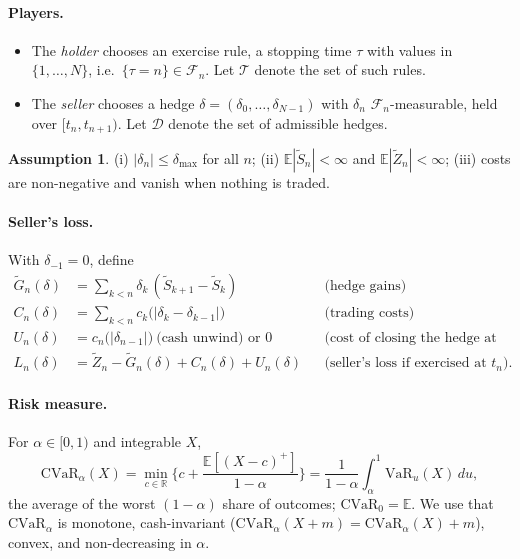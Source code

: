 \documentclass[11pt]{article}
\theoremstyle{definition}
\newtheorem{assumption}{Assumption}
\theoremstyle{remark}
\newcommand{\E}{\mathbb{E}}
\newcommand{\F}{\mathcal{F}}
\newcommand{\T}{\mathcal{T}}
\newcommand{\D}{\mathcal{D}}
\newcommand{\CVaR}{\mathrm{CVaR}}
\newcommand{\VaR}{\mathrm{VaR}}
\newcommand{\St}{\tilde S}
\newcommand{\Zt}{\tilde Z}
\newcommand{\Gt}{\tilde G}
\begin{document}
\paragraph{Players.}
\begin{itemize}[leftmargin=*]
\item The \emph{holder} chooses an exercise rule, a stopping time $\tau$ with values in $\{1,\dots,N\}$,
  i.e.\ $\{\tau=n\}\in\F_n$. Let $\T$ denote the set of such rules.
\item The \emph{seller} chooses a hedge $\delta=(\delta_0,\dots,\delta_{N-1})$ with $\delta_n$
  $\F_n$-measurable, held over $[t_n,t_{n+1})$. Let $\D$ denote the set of admissible hedges.
\end{itemize}

\begin{assumption}\label{ass:standing}
(i) $|\delta_n|\le\delta_{\max}$ for all $n$; (ii) $\E|\St_n|<\infty$ and $\E|\Zt_n|<\infty$;
(iii) costs are non-negative and vanish when nothing is traded.
\end{assumption}

\paragraph{Seller's loss.} With $\delta_{-1}=0$, define
\begin{align*}
\Gt_n(\delta)&=\sum_{k<n}\delta_k\,(\St_{k+1}-\St_k) &&\text{(hedge gains)}\\
C_n(\delta)&=\sum_{k<n}c_k\big(|\delta_k-\delta_{k-1}|\big) &&\text{(trading costs)}\\
U_n(\delta)&=c_n\big(|\delta_{n-1}|\big)\ \text{(cash unwind) or } 0 &&\text{(cost of closing the hedge at exercise)}\\
L_n(\delta)&=\Zt_n-\Gt_n(\delta)+C_n(\delta)+U_n(\delta) &&\text{(seller's loss if exercised at $t_n$).}
\end{align*}

\paragraph{Risk measure.} For $\alpha\in[0,1)$ and integrable $X$,
\begin{equation}\label{eq:ru}
\CVaR_\alpha(X)=\min_{c\in\mathbb R}\Big\{c+\frac{\E[(X-c)^+]}{1-\alpha}\Big\}
=\frac{1}{1-\alpha}\int_\alpha^1\VaR_u(X)\,du ,
\end{equation}
the average of the worst $(1-\alpha)$ share of outcomes; $\CVaR_0=\E$. We use that $\CVaR_\alpha$ is
monotone, cash-invariant ($\CVaR_\alpha(X+m)=\CVaR_\alpha(X)+m$), convex, and non-decreasing in $\alpha$.
\end{document}
